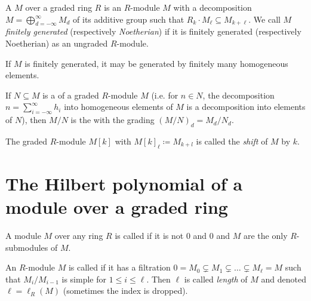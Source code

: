 \documentclass[a4paper,parskip=half,numbers=enddot, DIV=12]{scrreprt}
\begin{document}
\begin{defi}
    A  $M$ over a graded ring $R$ is an $R$-module $M$ with a decomposition $M=\bigoplus_{d=-\infty}^\infty M_d$ of its additive group such that $R_k\cdot M_\ell \subseteq M_{k+\ell}$. We call $M$ \emph{finitely generated} (respectively \emph{Noetherian}) if it is finitely generated (respectively Noetherian) as an ungraded $R$-module. 
\end{defi}
\begin{rem}
    If $M$ is finitely generated, it may be generated by finitely many homogeneous elements.
\end{rem}
\begin{defi}
    \begin{alphanumerate}
        \item {}
            If $N\subseteq M$ is a  of a graded $R$-module $M$ (i.e. for $n\in N$, the decomposition $n=\sum_{i=-\infty}^\infty h_i$ into homogeneous elements of $M$ is a decomposition into elements of $N$), then $M/N$ is the  with the grading $(M/N)_d = M_d/N_d$.
        \item   
            The graded $R$-module $M[k]$ with $M[k]_\ell \coloneqq M_{k+l}$ is called the \emph{shift} of $M$ by $k$.
    \end{alphanumerate}
\end{defi}

\section{The Hilbert polynomial of a module over a graded ring}

\begin{defi}
    \begin{alphanumerate}
    \item 
        A module $M$ over any ring $R$ is called  if it is not $0$ and $0$ and $M$ are the only $R$-submodules of $M$.
    \item {}
        An $R$-module $M$ is called  if it has a filtration $0 = M_0\subsetneq M_1\subsetneq\ldots\subsetneq M_\ell = M$ such that $M_i/M_{i-1}$ is simple for $1\leq i\leq\ell$. Then $\ell$ is called \emph{length} of $M$ and denoted $\ell=\ell_R(M)$ (sometimes the index is dropped). 
    \end{alphanumerate}
\end{defi}
\end{document}
